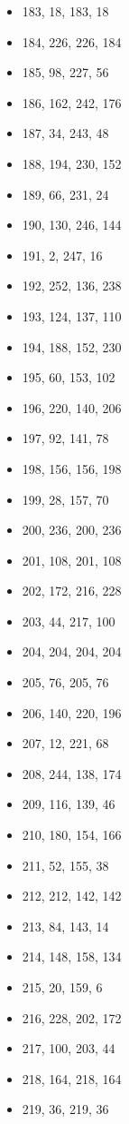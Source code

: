 \documentclass[12pt, fleqn]{report}                             %
\theoremstyle{break}                                            %
\begin{document}
\begin{multicols}{3}
\begin{itemize}
        \item 183, 18, 183, 18
        \item 184, 226, 226, 184
        \item 185, 98, 227, 56
        \item 186, 162, 242, 176
        \item 187, 34, 243, 48
        \item 188, 194, 230, 152
        \item 189, 66, 231, 24
        \item 190, 130, 246, 144
        \item 191, 2, 247, 16
        \item 192, 252, 136, 238
        \item 193, 124, 137, 110
        \item 194, 188, 152, 230
        \item 195, 60, 153, 102
        \item 196, 220, 140, 206
        \item 197, 92, 141, 78
        \item 198, 156, 156, 198
        \item 199, 28, 157, 70
        \item 200, 236, 200, 236
        \item 201, 108, 201, 108
        \item 202, 172, 216, 228
        \item 203, 44, 217, 100
        \item 204, 204, 204, 204
        \item 205, 76, 205, 76
        \item 206, 140, 220, 196
        \item 207, 12, 221, 68
        \item 208, 244, 138, 174
        \item 209, 116, 139, 46
        \item 210, 180, 154, 166
        \item 211, 52, 155, 38
        \item 212, 212, 142, 142
        \item 213, 84, 143, 14
        \item 214, 148, 158, 134
        \item 215, 20, 159, 6
        \item 216, 228, 202, 172
        \item 217, 100, 203, 44
        \item 218, 164, 218, 164
        \item 219, 36, 219, 36

\end{itemize}
\end{multicols}
\end{document}
